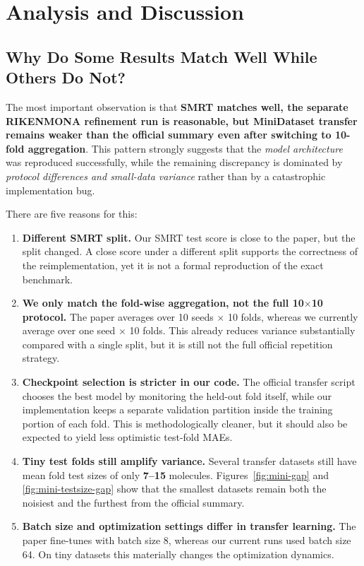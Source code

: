 \section{Analysis and Discussion}

\subsection{Why Do Some Results Match Well While Others Do Not?}

The most important observation is that \textbf{SMRT matches well, the separate RIKENMONA refinement run is reasonable, but MiniDataset transfer remains weaker than the official summary even after switching to 10-fold aggregation}. This pattern strongly suggests that the \emph{model architecture} was reproduced successfully, while the remaining discrepancy is dominated by \emph{protocol differences and small-data variance} rather than by a catastrophic implementation bug.

There are five reasons for this:

\begin{enumerate}
    \item \textbf{Different SMRT split.} Our SMRT test score is close to the paper, but the split changed. A close score under a different split supports the correctness of the reimplementation, yet it is not a formal reproduction of the exact benchmark.
    \item \textbf{We only match the fold-wise aggregation, not the full 10\(\times\)10 protocol.} The paper averages over 10 seeds \(\times\) 10 folds, whereas we currently average over one seed \(\times\) 10 folds. This already reduces variance substantially compared with a single split, but it is still not the full official repetition strategy.
    \item \textbf{Checkpoint selection is stricter in our code.} The official transfer script chooses the best model by monitoring the held-out fold itself, while our implementation keeps a separate validation partition inside the training portion of each fold. This is methodologically cleaner, but it should also be expected to yield less optimistic test-fold MAEs.
    \item \textbf{Tiny test folds still amplify variance.} Several transfer datasets still have mean fold test sizes of only \textbf{7--15} molecules. Figures~\ref{fig:mini-gap} and \ref{fig:mini-testsize-gap} show that the smallest datasets remain both the noisiest and the furthest from the official summary.
    \item \textbf{Batch size and optimization settings differ in transfer learning.} The paper fine-tunes with batch size 8, whereas our current runs used batch size 64. On tiny datasets this materially changes the optimization dynamics.
\end{enumerate}

